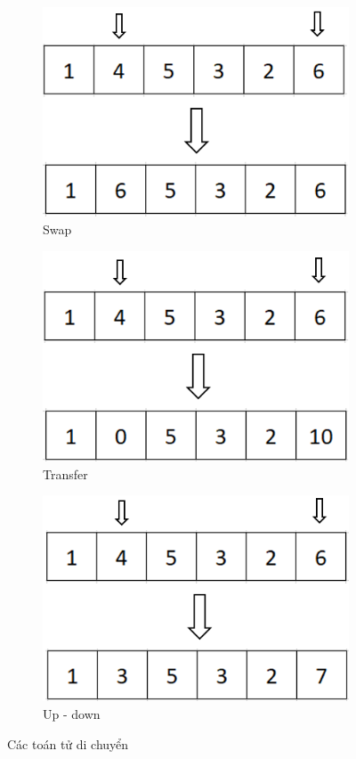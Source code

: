 \begin{figure}[h!]
    \centering
    \begin{subfigure}[b]{0.4\linewidth}
        \centering
        \includegraphics[width=0.8\linewidth]{picture/move1.png}
        \caption{Swap}
    \end{subfigure}
    \begin{subfigure}[b]{0.4\linewidth}
        \centering
      \includegraphics[width=0.8\linewidth]{picture/move2.png}
      \caption{Transfer}
    \end{subfigure}
    \begin{subfigure}[b]{0.4\linewidth}
        \centering
        \includegraphics[width=0.8\linewidth]{picture/move3.png}
        \caption{Up - down}
    \end{subfigure}
    \caption{Các toán tử di chuyển}
    \label{fig:coffee}
\end{figure}
